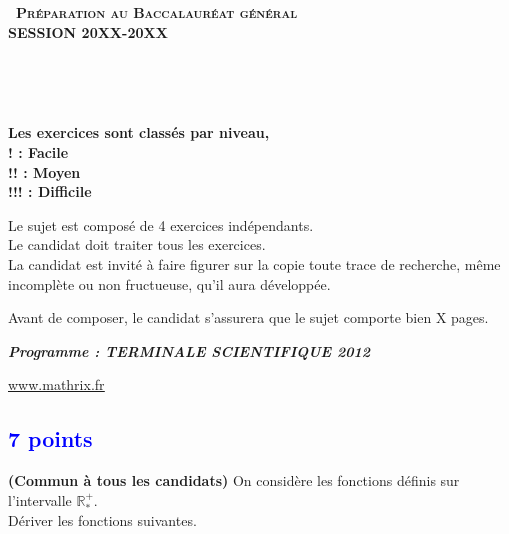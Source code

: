 \documentclass[12pt]{article}
\newcommand{\easy}[2]{\hspace*{0.5cm} \textbf{( ! )}\\}
\begin{document}
\setlength\parindent{0mm}

		\renewcommand \footrulewidth{.2pt}
		\pagestyle{fancy}
		\thispagestyle{empty} 

		\begin{center} 
		{\Large{\textbf{\textsc{\decofourleft~Préparation au Baccalauréat général ~\decofourright\\[5pt]
		\vspace{0.3cm}
		SESSION 20XX-20XX}}}}


		\vspace{1cm}

		\\

		\vspace{1.2cm}

		\\
		\vspace{0.4cm}

		\vspace{0.4cm}
		\textbf{Les exercices sont classés par niveau, \\ 
		! : Facile\\
		!! : Moyen\\
		!!! : Difficile }
		\vspace{1.5cm}

		Le sujet est composé de 4 exercices indépendants.\\
		Le candidat doit traiter tous les exercices.\\
		La candidat est invité à faire figurer sur la copie toute trace de recherche, même incomplète ou 			non fructueuse, qu'il aura développée.

		\vspace{1.5cm}

		Avant de composer, le candidat s'assurera que le sujet comporte bien X pages.

		\vspace{1cm}

		\textbf{\textit{Programme : TERMINALE SCIENTIFIQUE 2012}}
	
		\vspace{2cm}
		\href{http://www.mathrix.fr}{\Large\underline{www.mathrix.fr}}


\newpage
	\end{center}







\subsection{\textcolor{blue}{\hfill 7 points}}
\label{courbe}

\medskip
\noindent\textbf{(Commun à tous les candidats) \easy }
\medskip
On considère les fonctions définis sur l'intervalle $\mathbb{R}_{*}^{+}$.\\
Dériver les fonctions suivantes.

\medskip
\end{document}
